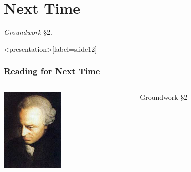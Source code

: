 
\section{Next Time}\label{sec:next_time} %

\emph{Groundwork} \S 2.

\begin{frame}<presentation>[label=slide12]
    \frametitle{Reading for Next Time}
        \begin{columns}
            \begin{column}{3cm}
                \includegraphics[height=4cm]{../../../graphics/kant.jpg}
            \end{column}
            \begin{column}{7cm}
                \alert{Groundwork \S 2}
            \end{column}
        \end{columns}
\end{frame}



